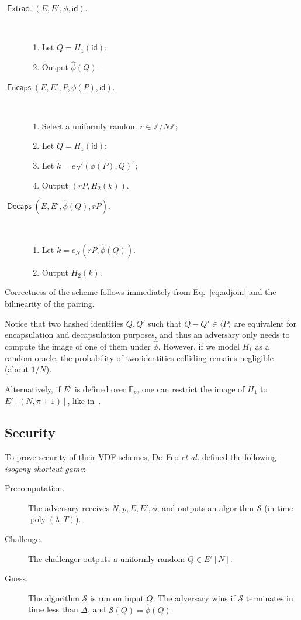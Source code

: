 \documentclass{llncs}
\newcommand{\Z}{\mathbb{Z}}
\newcommand{\F}{\mathbb{F}}
\DeclareMathOperator{\poly}{poly}
\DeclareMathOperator{\Extract}{\mathsf{Extract}}
\DeclareMathOperator{\Encaps}{\mathsf{Encaps}}
\DeclareMathOperator{\Decaps}{\mathsf{Decaps}}
\newcommand{\id}{\mathsf{id}}
\begin{document}
\begin{description}
\item[$\Extract(E,E',\phi,\id)$.]\
  \begin{enumerate}
  \item Let $Q = H_1(\id)$;
  \item Output $\hat\phi(Q)$.
  \end{enumerate}
\item[$\Encaps(E,E',P,\phi(P),\id)$.]\
  \begin{enumerate}
  \item Select a uniformly random $r\in\Z/N\Z$;
  \item Let $Q = H_1(\id)$;
  \item Let $k=e_N'(\phi(P),Q)^r$;
  \item Output $(rP,H_2(k))$.
  \end{enumerate}
\item[$\Decaps(E,E',\hat\phi(Q),rP)$.]\
  \begin{enumerate}
  \item Let $k = e_N(rP,\hat\phi(Q))$.
  \item Output $H_2(k)$.
  \end{enumerate}
\end{description}

Correctness of the scheme follows immediately from
Eq.~\eqref{eq:adjoin} and the bilinearity of the pairing. %

\begin{remark}
  Notice that two hashed identities $Q,Q'$ such that
  $Q-Q'\in \langle P\rangle$ are equivalent for encapsulation and
  decapsulation purposes, and thus an adversary only needs to compute
  the image of one of them under $\hat\phi$. %
  However, if we model $H_1$ as a random oracle, the probability of
  two identities colliding remains negligible (about $1/N$).
  
  Alternatively, if $E'$ is defined over $\F_p$, one can restrict the
  image of $H_1$ to $E'[(N,\pi+1)]$, like
  in~\cite{10.1007/978-3-030-34578-5_10}.
\end{remark}


\subsection{Security}

To prove security of their VDF schemes, De~Feo \emph{et al.} defined
the following \emph{isogeny shortcut game}:

\begin{description}
\item[Precomputation.] The adversary receives $N,p,E,E',\phi$, and
  outputs an algorithm $\mathcal{S}$ (in time $\poly(\lambda,T)$).
\item[Challenge.] The challenger outputs a uniformly random
  $Q\in E'[N]$.
\item[Guess.] The algorithm $\mathcal{S}$ is run on input $Q$. The
  adversary wins if $\mathcal{S}$ terminates in time less than
  $\Delta$, and $\mathcal{S}(Q) = \hat\phi(Q)$.
\end{description}
\end{document}
